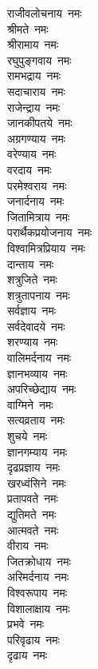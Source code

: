 \begin{multicols}{2}
\begin{flushleft}
राजीवलोचनाय~नमः\\
श्रीमते~नमः\\
श्रीरामाय~नमः\\
रघुपुङ्गवाय~नमः\\
रामभद्राय~नमः\\
सदाचाराय~नमः\\
राजेन्द्राय~नमः\\
जानकीपतये~नमः\\
अग्रगण्याय~नमः\\
वरेण्याय~नमः\hfill{}\\
वरदाय~नमः\\
परमेश्वराय~नमः\\
जनार्दनाय~नमः\\
जितामित्राय~नमः\\
परार्थैकप्रयोजनाय~नमः\\
विश्वामित्रप्रियाय~नमः\\
दान्ताय~नमः\\
शत्रुजिते~नमः\\
शत्रुतापनाय~नमः\\
सर्वज्ञाय~नमः\hfill{}\\
सर्वदेवादये~नमः\\
शरण्याय~नमः\\
वालिमर्दनाय~नमः\\
ज्ञानभव्याय~नमः\\
अपरिच्छेद्याय~नमः\\
वाग्मिने~नमः\\
सत्यव्रताय~नमः\\
शुचये~नमः\\
ज्ञानगम्याय~नमः\\
दृढप्रज्ञाय~नमः\hfill{}\\
खरध्वंसिने~नमः\\
प्रतापवते~नमः\\
द्युतिमते~नमः\\
आत्मवते~नमः\\
वीराय~नमः\\
जितक्रोधाय~नमः\\
अरिमर्दनाय~नमः\\
विश्वरूपाय~नमः\\
विशालाक्षाय~नमः\\
प्रभवे~नमः\hfill{}\\
परिवृढाय~नमः\\
दृढाय~नमः\\

\end{flushleft}
\end{multicols}
